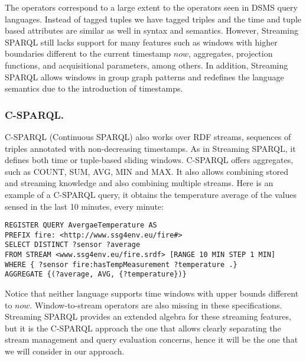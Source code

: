 The operators correspond to a large extent to the operators seen in DSMS query languages. %
Instead of tagged tuples we have tagged triples and the time and tuple based attributes are similar as well in syntax
and semantics. However, Streaming SPARQL still lacks support for many features such as windows with higher boundaries
different to the current timestamp $now$, aggregates, projection functions, and acquisitional parameters, among others.
In addition, Streaming SPARQL allows windows in group graph patterns and redefines the language semantics due to the
introduction of timestamps.

\subsubsection{C-SPARQL.} C-SPARQL (Continuous SPARQL) \cite{Barbieri_2010} also works over RDF streams, sequences of triples annotated with non-decreasing timestamps. As in Streaming SPARQL, it defines both time or tuple-based sliding windows. C-SPARQL offers aggregates, such as \textsf{COUNT, SUM, AVG, MIN} and \textsf{MAX}. It also allows combining stored and streaming knowledge and also combining multiple streams. Here is an example of a C-SPARQL query, it obtains the temperature average of the values sensed in the last 10 minutes, every minute:

\begin{lstlisting}[style=SPARQLSTRStyle,language=SPARQLSTR,frame=none]
REGISTER QUERY AvergaeTemperature AS
PREFIX fire: <http://www.ssg4env.eu/fire#>
SELECT DISTINCT ?sensor ?average
FROM STREAM <www.ssg4env.eu/fire.srdf> [RANGE 10 MIN STEP 1 MIN]
WHERE { ?sensor fire:hasTempMeasurement ?temperature .}
AGGREGATE {(?average, AVG, {?temperature})}
\end{lstlisting}

Notice that neither language supports time windows with upper bounds different to $now$. Window-to-stream operators are
also missing in these specifications. Streaming SPARQL provides an extended algebra for these streaming features, but
it is the C-SPARQL approach the one that allows clearly separating the stream management and query evaluation concerns,
hence it will be the one that we will consider in our approach.
